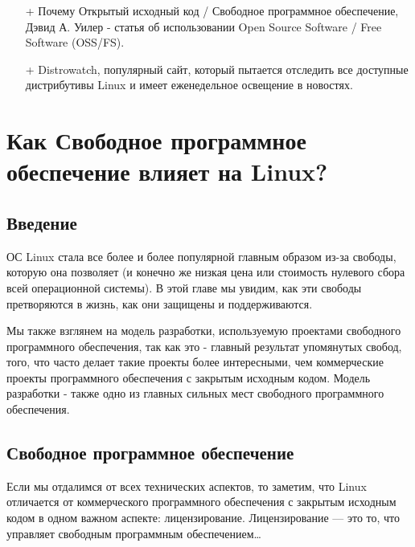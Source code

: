 \documentclass[10pt]{book}
\begin{document}
\phantom{}
\begin{tcolorbox}[title=\textbf{Дальнейшие ресурсы}, colback=yellow!14!white, colframe=red!75!blue]
\begin{itemize}
	\item[+] Почему Открытый исходный код / Свободное программное обеспечение, Дэвид А. Уилер - статья об использовании Open Source Software / Free Software (OSS/FS).
	\item[+] Distrowatch, популярный сайт, который пытается отследить все доступные дистрибутивы Linux и имеет еженедельное освещение в новостях.
\end{itemize}
\end{tcolorbox}

\newpage


\chapter{Как Свободное программное обеспечение влияет на Linux?}

\section*{Введение}

ОС Linux стала все более и более популярной главным образом из-за свободы, которую она позволяет (и конечно же низкая цена или стоимость нулевого сбора всей операционной системы). В этой главе мы увидим, как эти свободы претворяются в жизнь, как они защищены и поддерживаются.

Мы также взглянем на модель разработки, используемую проектами свободного программного обеспечения, так как это - главный результат упомянутых свобод, того, что часто делает такие проекты более интересными, чем коммерческие проекты программного обеспечения с закрытым исходным кодом. Модель разработки - также одно из главных сильных мест свободного программного обеспечения.

\section{Свободное программное обеспечение}

Если мы отдалимся от всех технических аспектов, то заметим, что Linux отличается от коммерческого программного обеспечения с закрытым исходным кодом в одном важном аспекте: лицензирование. Лицензирование --- это то, что управляет свободным программным обеспечением\ldots
\end{document}
